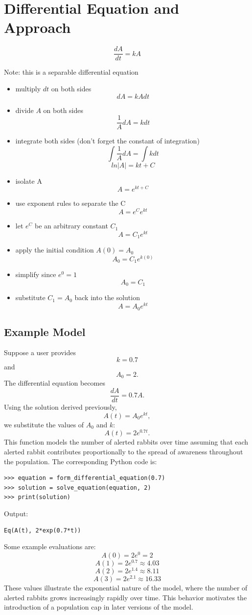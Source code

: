 \documentclass{article}
\begin{document}
\section{Differential Equation and Approach}
\[ \frac{dA}{dt} = kA \]

Note: this is a separable differential equation
\begin{itemize}
    \item multiply $dt$ on both sides
    \[ dA = kA dt \]
    \item divide $A$ on both sides
    \[ \frac{1}{A}dA = k dt \]
    \item integrate both sides (don't forget the constant of integration)
    \[ \int\frac{1}{A}dA = \int k dt \]
    \[ ln |A| = kt + C \]
    \item isolate A
    \[ A = e^{kt + C}\]
    \item use exponent rules to separate the C 
    \[ A = e^C e^{kt} \] 
    \item let $e^C$ be an arbitrary constant $C_1$ 
    \[ A = C_1 e^{kt} \] 
    \item apply the initial condition $A(0)=A_0$ 
    \[ A_0 = C_1 e^{k(0)} \] 
    \item simplify since $e^0 = 1$ 
    \[ A_0 = C_1 \] 
    \item substitute $C_1 = A_0$ back into the solution 
    \[ A = A_0 e^{kt} \]
\end{itemize}

\subsection{Example Model} Suppose a user provides 
\[ k = 0.7 \] and \[ A_0 = 2. \] 
The differential equation becomes 
\[ \frac{dA}{dt} = 0.7A. \] 
Using the solution derived previously, 
\[ A(t)=A_0e^{kt}, \] 
we substitute the values of $A_0$ and $k$: 
\[ A(t)=2e^{0.7t}. \] 
This function models the number of alerted rabbits 
over time assuming that each alerted rabbit contributes 
proportionally to the spread of awareness throughout the population. 
The corresponding Python code is: 
\begin{verbatim} 
>>> equation = form_differential_equation(0.7)
>>> solution = solve_equation(equation, 2)
>>> print(solution)
\end{verbatim} 
Output: 
\begin{verbatim} 
Eq(A(t), 2*exp(0.7*t))
\end{verbatim} 
Some example evaluations are: 
\[ A(0)=2e^0=2 \] \[ A(1)=2e^{0.7}\approx 4.03 \] \[ A(2)=2e^{1.4}\approx 8.11 \] \[ A(3)=2e^{2.1}\approx 16.33 \] These values illustrate the exponential nature of the model, where the number of alerted rabbits grows increasingly rapidly over time. This behavior motivates the introduction of a population cap in later versions of the model.
\end{document}
